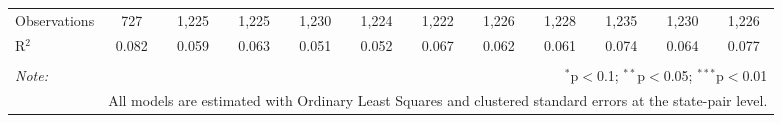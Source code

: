 \begin{table}[!htbp]
\begin{tabular}{@{\extracolsep{5pt}}lccccccccccc}
Observations & 727 & 1,225 & 1,225 & 1,230 & 1,224 & 1,222 & 1,226 & 1,228 & 1,235 & 1,230 & 1,226 \\ 
R$^{2}$ & 0.082 & 0.059 & 0.063 & 0.051 & 0.052 & 0.067 & 0.062 & 0.061 & 0.074 & 0.064 & 0.077 \\ 
\hline 
\hline \\[-1.8ex] 
\textit{Note:}  & \multicolumn{11}{r}{$^{*}$p$<$0.1; $^{**}$p$<$0.05; $^{***}$p$<$0.01} \\ 
 & \multicolumn{11}{r}{All models are estimated with Ordinary Least Squares and clustered standard errors at the state-pair level.} \\ 
\end{tabular} 
\end{table} 
